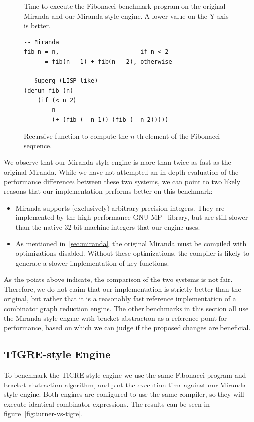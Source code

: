\documentclass[conference]{IEEEtran}
\begin{document}
\begin{figure}
    
    \centering
    \caption{
        Time to execute the Fibonacci benchmark program on the original Miranda and our Miranda-style engine.
        A lower value on the Y-axis is better.}
    \label{fig:turner-vs-miranda}
\end{figure}

\begin{figure}
    \begin{lstlisting}
-- Miranda
fib n = n,                       if n < 2
      = fib(n - 1) + fib(n - 2), otherwise

-- Superg (LISP-like)
(defun fib (n)
    (if (< n 2) 
        n
        (+ (fib (- n 1)) (fib (- n 2)))))
    \end{lstlisting}
    \centering
    \caption{
        Recursive function to compute the $n$-th element of the Fibonacci sequence.
    }
    \label{fig:fib}
\end{figure}

We observe that our Miranda-style engine is more than twice as fast as the original Miranda.
While we have not attempted an in-depth evaluation of the performance differences between these two systems, we can point to two likely reasons that our implementation performs better on this benchmark:
\begin{itemize}
    \item Miranda supports (exclusively) arbitrary precision integers.
          They are implemented by the high-performance GNU MP~\cite{gnump} library, but are still slower than the native 32-bit machine integers that our engine uses.
    \item As mentioned in~\ref{sec:miranda}, the original Miranda must be compiled with optimizations disabled.
          Without these optimizations, the compiler is likely to generate a slower implementation of key functions.
\end{itemize}

As the points above indicate, the comparison of the two systems is not fair.
Therefore, we do not claim that our implementation is strictly better than the original, but rather that it is a reasonably fast reference implementation of a combinator graph reduction engine.
The other benchmarks in this section all use the Miranda-style engine with bracket abstraction as a reference point for performance, based on which we can judge if the proposed changes are beneficial.

\subsection{TIGRE-style Engine}
To benchmark the TIGRE-style engine we use the same Fibonacci program and bracket abstraction algorithm, and plot the execution time against our Miranda-style engine.
Both engines are configured to use the same compiler, so they will execute identical combinator expressions.
The results can be seen in figure~\ref{fig:turner-vs-tigre}.
\end{document}
